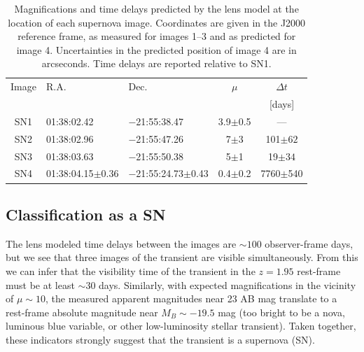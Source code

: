 \documentclass[12pt,dvipsnames]{article}
\begin{document}
\begin{table}[]
    \centering
    \begin{tabular}{c|l|l|c|c|}
    Image     & R.A. & Dec. & $\mu$ & $\Delta t$ \\
    & & & & [days] \\
\hline 
SN1 & 01:38:02.42     & $-$21:55:38.47         & 3.9$\pm$0.5   &   --- \\
SN2 & 01:38:02.96     & $-$21:55:47.26         & 7$\pm$3     & 101$\pm62$ \\
SN3 & 01:38:03.63     & $-$21:55:50.38         & 5$\pm$1     &  19$\pm34$\\
SN4 & 01:38:04.15$\pm$0.36 & $-$21:55:24.73$\pm$0.43 & 0.4$\pm$0.2 & 7760$\pm$540\\
\hline 
\end{tabular}
    \caption{Magnifications and time delays predicted by the lens model at the location of each supernova image. Coordinates are given in the J2000 reference frame, as measured for images 1--3 and as predicted for image 4.  Uncertainties in the predicted position of image 4 are in arcseconds.  Time delays are reported relative to SN1.}
    \label{tab:snpred}
\end{table}


\subsection*{Classification as a SN}
The lens modeled time delays between the images are $\sim100$ observer-frame days, 
but we see that three images of the transient are visible simultaneously.
From this we can infer that the visibility time of the transient in the $z=1.95$ rest-frame must be at least $\sim$30 days. 
Similarly, with expected magnifications in the vicinity of $\mu\sim10$, the measured apparent magnitudes near 23 AB mag translate to a rest-frame absolute magnitude near $M_B \sim-19.5$ mag (too bright to be a nova, luminous blue variable, or other low-luminosity stellar transient).
Taken together, these indicators strongly suggest that the transient is a supernova (SN). 
\end{document}
